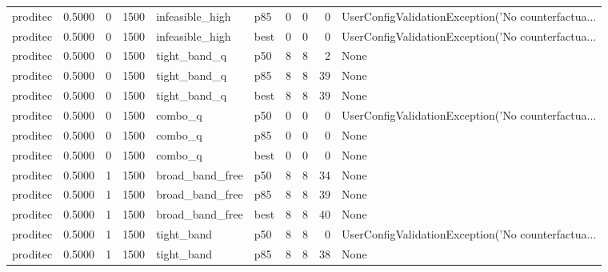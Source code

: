 \begin{tabular}{lrrrllrrrl}
proditec &    0.5000 &    0 &   1500 &      infeasible\_high &    p85 &               0 &          0 &       0 & UserConfigValidationException('No counterfactua... \\
proditec &    0.5000 &    0 &   1500 &      infeasible\_high &   best &               0 &          0 &       0 & UserConfigValidationException('No counterfactua... \\
proditec &    0.5000 &    0 &   1500 &         tight\_band\_q &    p50 &               8 &          8 &       2 &                                               None \\
proditec &    0.5000 &    0 &   1500 &         tight\_band\_q &    p85 &               8 &          8 &      39 &                                               None \\
proditec &    0.5000 &    0 &   1500 &         tight\_band\_q &   best &               8 &          8 &      39 &                                               None \\
proditec &    0.5000 &    0 &   1500 &              combo\_q &    p50 &               0 &          0 &       0 & UserConfigValidationException('No counterfactua... \\
proditec &    0.5000 &    0 &   1500 &              combo\_q &    p85 &               0 &          0 &       0 &                                               None \\
proditec &    0.5000 &    0 &   1500 &              combo\_q &   best &               0 &          0 &       0 &                                               None \\
proditec &    0.5000 &    1 &   1500 &      broad\_band\_free &    p50 &               8 &          8 &      34 &                                               None \\
proditec &    0.5000 &    1 &   1500 &      broad\_band\_free &    p85 &               8 &          8 &      39 &                                               None \\
proditec &    0.5000 &    1 &   1500 &      broad\_band\_free &   best &               8 &          8 &      40 &                                               None \\
proditec &    0.5000 &    1 &   1500 &           tight\_band &    p50 &               8 &          8 &       0 & UserConfigValidationException('No counterfactua... \\
proditec &    0.5000 &    1 &   1500 &           tight\_band &    p85 &               8 &          8 &      38 &                                               None \\

\end{tabular}

